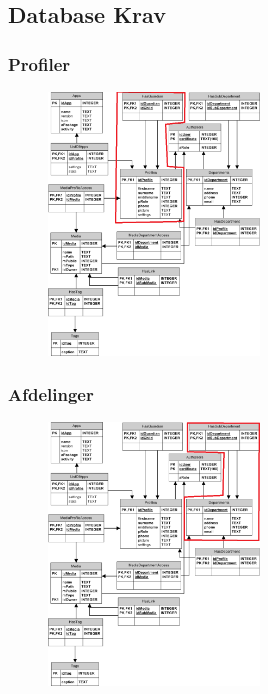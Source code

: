 \documentclass{beamer}
\begin{document}
\subsection{Database Krav}

\begin{frame}
	\frametitle{Profiler}
	
	\begin{figure}[!h]
		\centering
			\includegraphics[width=0.5\textwidth]{dbProfiler}
		\label{fig:profiler}
	\end{figure}
\end{frame}

\begin{frame}
	\frametitle{Afdelinger}
	
	\begin{figure}[!h]
		\centering
			\includegraphics[width=0.5\textwidth]{dbAfdelinger}
		\label{fig:Afdelinger}
	\end{figure}
\end{frame}
\end{document}
